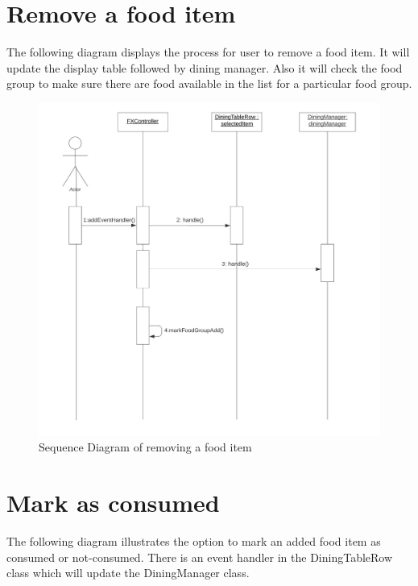 \documentclass{scrreprt}
\begin{document}
\FloatBarrier

\section{Remove a food item}

The following diagram displays the process for user to remove a food item. It will update the display table followed by dining manager. Also it will check the food group to make sure there are food available in the list for a particular food group.
\begin{figure}[!htbp]
\centering
\includegraphics[width=15cm]{pictures/remove-food-sd.png}
\caption*{Sequence Diagram of removing a food item}
\end{figure}

\FloatBarrier

\section{Mark as consumed}

The following diagram illustrates the option to mark an added food item as consumed or not-consumed. There is an event handler in the DiningTableRow class which will update the DiningManager class.
\end{document}
